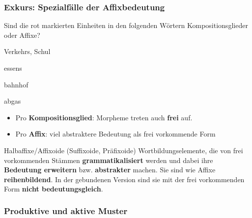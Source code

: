 \begin{frame}
\frametitle{Exkurs: Spezialfälle der Affixbedeutung}


Sind die rot markierten Einheiten in den folgenden Wörtern Kompositionsglieder oder Affixe? 

\eal 
\ex Verkehrs, Schul

\ex essens


\ex {}bahnhof

\ex abgas
\zl

\pause

\begin{itemize}
\item Pro \textbf{Kompositionsglied}: Morpheme treten auch \textbf{frei} auf.

\item Pro \textbf{Affix}: viel abstraktere Bedeutung als frei vorkommende Form
\end{itemize}

\begin{block}{Halbaffixe/Affixoide (Suffixoide, Präfixoide)}
Wortbildungselemente, die von frei vorkommenden Stämmen \textbf{grammatikalisiert} werden und dabei ihre \textbf{Bedeutung erweitern} bzw. \textbf{abstrakter} machen. Sie sind wie Affixe \textbf{reihenbildend}. In der gebundenen Version sind sie mit der frei vorkommenden Form \textbf{nicht bedeutungsgleich}.
\end{block}

\end{frame}


\subsubsection{Produktive und aktive Muster}

